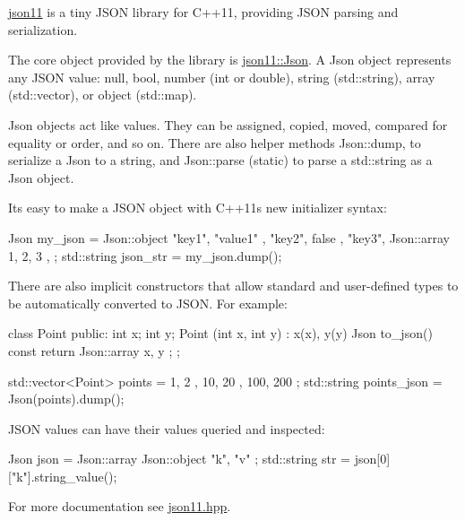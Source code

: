 \mbox{\hyperlink{namespacejson11}{json11}} is a tiny J\+S\+ON library for C++11, providing J\+S\+ON parsing and serialization.

The core object provided by the library is \mbox{\hyperlink{classjson11_1_1_json}{json11\+::\+Json}}. A Json object represents any J\+S\+ON value\+: null, bool, number (int or double), string (std\+::string), array (std\+::vector), or object (std\+::map).

Json objects act like values. They can be assigned, copied, moved, compared for equality or order, and so on. There are also helper methods Json\+::dump, to serialize a Json to a string, and Json\+::parse (static) to parse a std\+::string as a Json object.

It\textquotesingle{}s easy to make a J\+S\+ON object with C++11\textquotesingle{}s new initializer syntax\+: \begin{DoxyVerb}Json my_json = Json::object {
    { "key1", "value1" },
    { "key2", false },
    { "key3", Json::array { 1, 2, 3 } },
};
std::string json_str = my_json.dump();
\end{DoxyVerb}


There are also implicit constructors that allow standard and user-\/defined types to be automatically converted to J\+S\+ON. For example\+: \begin{DoxyVerb}class Point {
public:
    int x;
    int y;
    Point (int x, int y) : x(x), y(y) {}
    Json to_json() const { return Json::array { x, y }; }
};

std::vector<Point> points = { { 1, 2 }, { 10, 20 }, { 100, 200 } };
std::string points_json = Json(points).dump();
\end{DoxyVerb}


J\+S\+ON values can have their values queried and inspected\+: \begin{DoxyVerb}Json json = Json::array { Json::object { { "k", "v" } } };
std::string str = json[0]["k"].string_value();
\end{DoxyVerb}


For more documentation see \mbox{\hyperlink{json11_8hpp}{json11.\+hpp}}. 